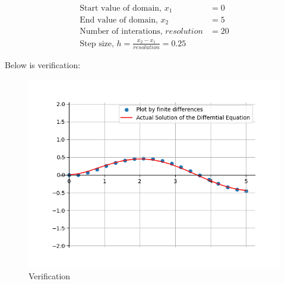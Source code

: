 \documentclass[journal]{IEEEtran}
\begin{document}
\begin{enumerate}
        
        

    \begin{align}
        \text{Start value of domain, } x_1 &= 0\\
        \text{End value of domain, } x_2 &= 5\\
        \text{Number of interations, } resolution &= 20\\
        \text{Step size, } h = \frac{x_2 - x_1}{resolution} = 0.25
    \end{align}

    Below is verification:
    \begin{figure}[h]  %
        \centering  %
        \includegraphics[width=\columnwidth]{figs/fig1.png}  
        \caption{Verification}
    \end{figure}


\end{enumerate}
\end{document}
